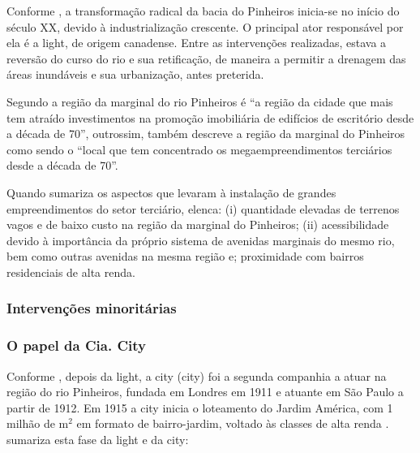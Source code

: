 \documentclass[
article,			%
11pt,				%
oneside,			%
a4paper,			%
english,			%
brazil,				%
sumario=tradicional
]{abntex2}
\begin{document}
	
	Conforme , a transformação radical da bacia do Pinheiros inicia-se no início do século XX, devido à industrialização crescente. O principal ator responsável por ela é a \glsdesc{light}, de origem canadense. Entre as intervenções realizadas, estava a reversão do curso do rio e sua retificação, de maneira a permitir a drenagem das áreas inundáveis e sua urbanização, antes preterida.
	
	Segundo  a região da marginal do rio Pinheiros é ``a região da cidade que mais tem atraído investimentos na promoção imobiliária de edifícios de escritório desde a década de 70'', outrossim,  também descreve a região da marginal do Pinheiros como sendo o ``local que tem concentrado os megaempreendimentos terciários desde a década de 70''.

	Quando  sumariza os aspectos que levaram à instalação de grandes empreendimentos do setor terciário, elenca: (i) quantidade elevadas de terrenos vagos e de baixo custo na região da marginal do Pinheiros; (ii) acessibilidade devido à importância da próprio sistema de avenidas marginais do mesmo rio, bem como outras avenidas na mesma região e; proximidade com bairros residenciais de alta renda.

	\subsubsection{Intervenções minoritárias} \label{s3:minoritariaspinheiros}
	
	\subsubsection{O papel da Cia. City} \label{s3:ciacity}
	
	Conforme , depois da \gls{light}, a \gls{city} (\glsdesc{city}) foi a segunda companhia a atuar na região do rio Pinheiros, fundada em Londres em 1911 e atuante em São Paulo a partir de 1912. Em 1915 a \gls{city} inicia o loteamento do Jardim América, com 1 milhão de m$^{2}$ em formato de bairro-jardim, voltado às classes de alta renda .  sumariza esta fase da \gls{light} e da \gls{city}:
	
\end{document}
